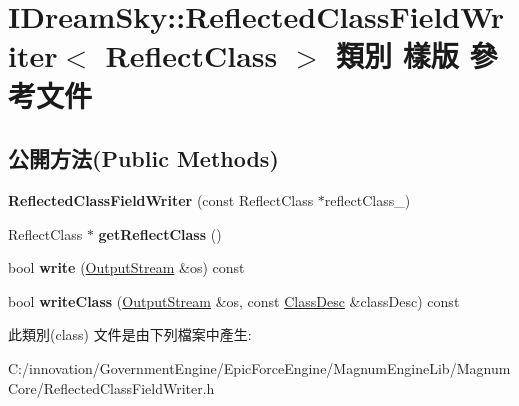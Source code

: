 \hypertarget{class_i_dream_sky_1_1_reflected_class_field_writer}{}\section{I\+Dream\+Sky\+:\+:Reflected\+Class\+Field\+Writer$<$ Reflect\+Class $>$ 類別 樣版 參考文件}
\label{class_i_dream_sky_1_1_reflected_class_field_writer}
\subsection*{公開方法(Public Methods)}
\begin{DoxyCompactItemize}
\item 
{\bfseries Reflected\+Class\+Field\+Writer} (const Reflect\+Class $\ast$reflect\+Class\+\_\+)\hypertarget{class_i_dream_sky_1_1_reflected_class_field_writer_ab2060f2f1b00a0df443039a61f0ea7d5}{}\label{class_i_dream_sky_1_1_reflected_class_field_writer_ab2060f2f1b00a0df443039a61f0ea7d5}

\item 
Reflect\+Class $\ast$ {\bfseries get\+Reflect\+Class} ()\hypertarget{class_i_dream_sky_1_1_reflected_class_field_writer_aebc4107633f302dc36f8154791bbaa59}{}\label{class_i_dream_sky_1_1_reflected_class_field_writer_aebc4107633f302dc36f8154791bbaa59}

\item 
bool {\bfseries write} (\hyperlink{class_i_dream_sky_1_1_output_stream}{Output\+Stream} \&os) const \hypertarget{class_i_dream_sky_1_1_reflected_class_field_writer_aea31ffa6cd5f70eca4bcdea1e2065110}{}\label{class_i_dream_sky_1_1_reflected_class_field_writer_aea31ffa6cd5f70eca4bcdea1e2065110}

\item 
bool {\bfseries write\+Class} (\hyperlink{class_i_dream_sky_1_1_output_stream}{Output\+Stream} \&os, const \hyperlink{classagm_1_1reflection_1_1_class_desc}{Class\+Desc} \&class\+Desc) const \hypertarget{class_i_dream_sky_1_1_reflected_class_field_writer_aa29a2d9ad493141e4fe19816641a34c1}{}\label{class_i_dream_sky_1_1_reflected_class_field_writer_aa29a2d9ad493141e4fe19816641a34c1}

\end{DoxyCompactItemize}


此類別(class) 文件是由下列檔案中產生\+:\begin{DoxyCompactItemize}
\item 
C\+:/innovation/\+Government\+Engine/\+Epic\+Force\+Engine/\+Magnum\+Engine\+Lib/\+Magnum\+Core/Reflected\+Class\+Field\+Writer.\+h\end{DoxyCompactItemize}
